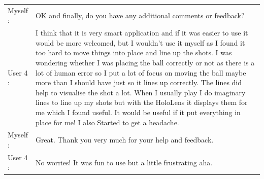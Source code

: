 \documentclass[ %
                author={Finn Alexander Wilkinson},
                supervisor={Dr. Andrew Calway},
                degree={MEng},
                title={\centering A Mixed Reality Aim Assistant for Pool and Snooker},
                subtitle={},
                type={Enterprise},
                year={2021} ]{dissertation}
\begin{document}
\begin{tabular}{l p{130mm}}
    Myself : & OK and finally, do you have any additional comments or feedback? \\
    User 4 : & I think that it is very smart application and if it was easier to use it would be more welcomed, but I wouldn't use it myself as I found it too hard to move things into place and line up the shots. I was wondering whether I was placing the ball correctly or not as there is a lot of human error so I put a lot of focus on moving the ball maybe more than I should have just so it lines up correctly. The lines did help to visualise the shot a lot. When I usually play I do imaginary lines to line up my shots but with the HoloLens it displays them for me which I found useful. It would be useful if it put everything in place for me! I also Started to get a headache. \\
    Myself : & Great. Thank you very much for your help and feedback. \\
    User 4 : & No worries! It was fun to use but a little frustrating aha. \\
\end{tabular}

\end{document}
